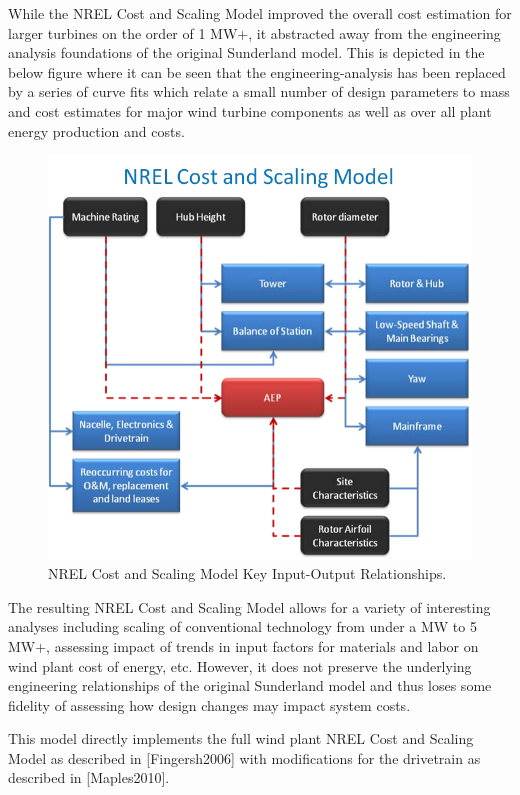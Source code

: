 \documentclass[letterpaper,10pt,openany,oneside]{sphinxmanual}
\begin{document}
While the NREL Cost and Scaling Model improved the overall cost estimation for larger turbines on the order of 1 MW+, it abstracted away from the engineering analysis foundations of the original Sunderland model.  This is depicted in the below figure where it can be seen that the engineering-analysis has been replaced by a series of curve fits which relate a small number of design parameters to mass and cost estimates for major wind turbine components as well as over all plant energy production and costs.
\begin{figure}[htbp]
\centering
\capstart

\includegraphics[width=5.5in]{NRELCSM.pdf}
\caption{NREL Cost and Scaling Model Key Input-Output Relationships.}\label{theory:nrelcsm}\end{figure}

The resulting NREL Cost and Scaling Model allows for a variety of interesting analyses including scaling of conventional technology from under a MW to 5 MW+, assessing impact of trends in input factors for materials and labor on wind plant cost of energy, etc.  However, it does not preserve the underlying engineering relationships of the original Sunderland model and thus loses some fidelity of assessing how design changes may impact system costs.

This model directly implements the full wind plant NREL Cost and Scaling Model as described in {[}Fingersh2006{]} with modifications for the drivetrain as described in {[}Maples2010{]}.
\end{document}
